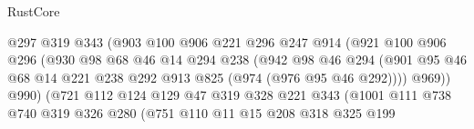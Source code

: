 \begin{lexlean}{RustCore}
\begin{coremodule}
                                @297
                                @319
                                @343
                                (@903
                                  @100
                                  @906
                                  @221
                                  @296
                                  @247
                                  @914
                                  (@921
                                    @100
                                    @906
                                    @296
                                    (@930
                                      @98
                                      @68
                                      @46
                                      @14
                                      @294
                                      @238
                                      (@942
                                        @98
                                        @46
                                        @294
                                        (@901
                                          @95
                                          @46
                                          @68
                                          @14
                                          @221
                                          @238
                                          @292
                                          @913
                                          @825
                                          (@974 (@976 @95 @46 @292))))
                                      @969))
                                  @990)
                                (@721
                                  @112
                                  @124
                                  @129
                                  @47
                                  @319
                                  @328
                                  @221
                                  @343
                                  (@1001
                                    @111
                                    @738
                                    @740
                                    @319
                                    @326
                                    @280
                                    (@751
                                      @110
                                      @11
                                      @15
                                      @208
                                      @318
                                      @325
                                      @199

\end{coremodule}
\end{lexlean}
